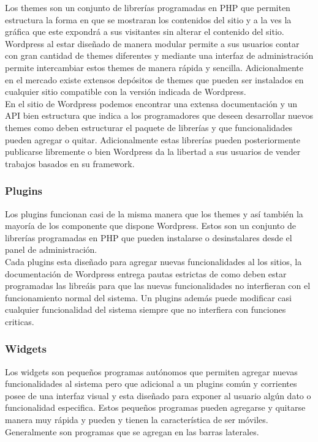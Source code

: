 Los themes son un conjunto de librerías programadas en PHP que permiten estructura la forma en que se mostraran los contenidos del sitio y a la ves la gráfica que este expondrá a sus visitantes sin alterar el contenido del sitio. Wordpress al estar diseñado de manera modular permite a sus usuarios contar con gran cantidad de themes diferentes y mediante una interfaz de administración permite intercambiar estos themes de manera rápida y sencilla. Adicionalmente en el mercado existe extensos depósitos de themes que pueden ser instalados en cualquier sitio compatible con la versión indicada de Wordpress.\\

En el sitio de Wordpress podemos encontrar una extensa documentación y un API bien estructura que indica a los programadores que deseen desarrollar nuevos themes como deben estructurar el paquete de librerías y que funcionalidades pueden agregar o quitar. Adicionalmente estas librerías pueden posteriormente publicarse libremente o bien Wordpress da la libertad a sus usuarios de vender trabajos basados en su framework.

\subsubsection{Plugins}
Los plugins funcionan casi de la misma manera que los themes y así también la mayoría de los componente que dispone Wordpress. Estos son un conjunto de librerías programadas en PHP que pueden instalarse o desinstalares desde el panel de administración.\\

Cada plugins esta diseñado para agregar nuevas funcionalidades al los sitios, la documentación de Wordpress entrega pautas estrictas de como deben estar programadas las libreáis para que las nuevas funcionalidades no interfieran con el funcionamiento normal del sistema. Un plugins además puede modificar casi cualquier funcionalidad del sistema siempre que no interfiera con funciones criticas.

\subsubsection{Widgets}
Los widgets son pequeños programas autónomos que permiten agregar nuevas funcionalidades al sistema pero que adicional a un plugins común y corrientes posee de una interfaz visual y esta diseñado para exponer al usuario algún dato o funcionalidad especifica. Estos pequeños programas pueden agregarse y quitarse manera muy rápida y pueden y tienen la característica de ser móviles. Generalmente son programas que se agregan en las barras laterales.


